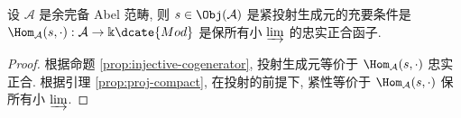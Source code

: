 \begin{proposition}\label{prop:proj-compact-gen}
	设 $\mathcal{A}$ 是余完备 Abel 范畴, 则 $s \in \Obj(\mathcal{A})$ 是紧投射生成元的充要条件是 $\Hom_{\mathcal{A}}(s, \cdot): \mathcal{A} \to \Bbbk\dcate{Mod}$ 是保所有小 $\varinjlim$ 的忠实正合函子.
\end{proposition}
\begin{proof}
	根据命题 \ref{prop:injective-cogenerator}, 投射生成元等价于 $\Hom_{\mathcal{A}}(s, \cdot)$ 忠实正合. 根据引理 \ref{prop:proj-compact}, 在投射的前提下, 紧性等价于 $\Hom_{\mathcal{A}}(s, \cdot)$ 保所有小 $\varinjlim$.
\end{proof}
